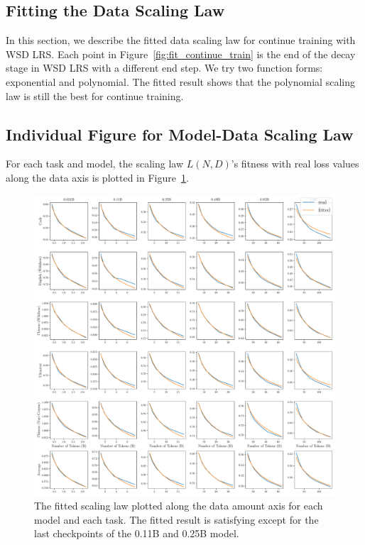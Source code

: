 \subsection{Fitting the Data Scaling Law}
\label{app:fittingdatascaling}
In this section, we describe the fitted data scaling law for continue training with WSD LRS. 
Each point in Figure~\ref{fig:fit_continue_train} is the end of the decay stage in WSD LRS with a different end step. We try two function forms: exponential and polynomial. The fitted result shows that the polynomial scaling law is still the best for continue training.

\subsection{Individual Figure for Model-Data Scaling Law}
For each task and model, the scaling law $L(N, D)$'s fitness with real loss values along the data axis is plotted in Figure~\ref{fig:individual_task_datascalinglaw}.

\begin{figure}
    \centering
    \includegraphics[width=1.0\textwidth]{Fig/individual_task_datascalinglaw.pdf}
    \caption{The fitted scaling law plotted along the data amount axis for each model and each task. The fitted result is satisfying except for the last checkpoints of the 0.11B and 0.25B model. }
    \label{fig:individual_task_datascalinglaw}
\end{figure}


